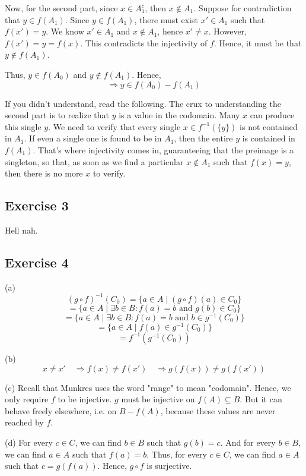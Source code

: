 \documentclass{book}
\begin{document}
Now, for the second part, since $x \in A_1^c$, then $x \not \in A_1$. Suppose for contradiction that $y \in f(A_1)$. Since $y \in f(A_1)$, there must exist $x' \in A_1$ such that $f(x') = y$. We know $x' \in A_1$ and $x \not \in A_1$, hence $x' \neq x$. However, $f(x') = y = f(x)$. This contradicts the injectivity of $f$. Hence, it must be that $y \not \in f(A_1)$.

Thus, $y \in f(A_0)$ and $y \not \in f(A_1)$. Hence,
$$\Rightarrow y \in f(A_0) - f(A_1)$$

If you didn't understand, read the following. The crux to understanding the second part is to realize that $y$ is a value in the codomain. Many $x$ can produce this single $y$. We need to verify that every single $x \in f^{-1}(\{ y \})$ is not contained in $A_1$. If even a single one is found to be in $A_1$, then the entire $y$ is contained in $f(A_1)$. That's where injectivity comes in, guaranteeing that the preimage is a singleton, so that, as soon as we find a particular $x \not \in A_1$ such that $f(x) = y$, then there is no more $x$ to verify.

\subsection*{Exercise 3}
Hell nah.

\subsection*{Exercise 4}
(a)
$$(g \circ f)^{-1}(C_0) = \{ a \in A \mid (g \circ f)(a) \in C_0 \}$$
$$= \{ a \in A \mid \exists b \in B : f(a) = b \text{ and } g(b) \in C_0 \}$$
$$= \{ a \in A \mid \exists b \in B : f(a) = b \text{ and } b \in g^{-1}(C_0) \}$$
$$= \{ a \in A \mid f(a) \in g^{-1}(C_0) \}$$
$$= f^{-1}(g^{-1}(C_0))$$

\noindent
(b)
$$x \neq x' \quad \Rightarrow f(x) \neq f(x') \quad \Rightarrow g(f(x)) \neq g(f(x'))$$

\noindent
(c)
Recall that Munkres uses the word "range" to mean "codomain". Hence, we only require $f$ to be injective. $g$ must be injective on $f(A) \subseteq B$. But it can behave freely elsewhere, i.e. on $B - f(A)$, because these values are never reached by $f$.

\noindent
(d)
For every $c \in C$, we can find $b \in B$ such that $g(b) = c$. And for every $b \in B$, we can find $a \in A$ such that $f(a) = b$. Thus, for every $c \in C$, we can find $a \in A$ such that $c = g(f(a))$. Hence, $g \circ f$ is surjective.
\end{document}
